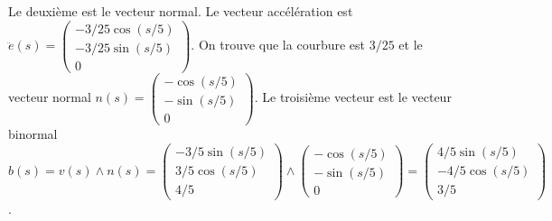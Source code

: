 {\begin{enumerate}
{ Le deuxième est le vecteur normal. Le vecteur accélération est $\ddot{e}(s)=\begin{pmatrix}-3/25\cos (s/5)\\-3/25\sin (s/5)\\0\end{pmatrix}$.
 On trouve que la courbure est $3/25$ et le vecteur normal 
 $n(s)=\begin{pmatrix}-\cos (s/5)\\-\sin (s/5)\\0\end{pmatrix}$.
 Le troisième vecteur est le vecteur binormal
 $b(s)=v(s)\wedge n(s)=\begin{pmatrix}-3/5\sin (s/5)\\3/5\cos (s/5)\\4/5\end{pmatrix}
 \wedge\begin{pmatrix}-\cos (s/5)\\-\sin (s/5)\\0\end{pmatrix}
 =\begin{pmatrix} 4/5\sin (s/5)\\-4/5 \cos (s/5)\\ 3/5\end{pmatrix}$.}
\end{enumerate}
}